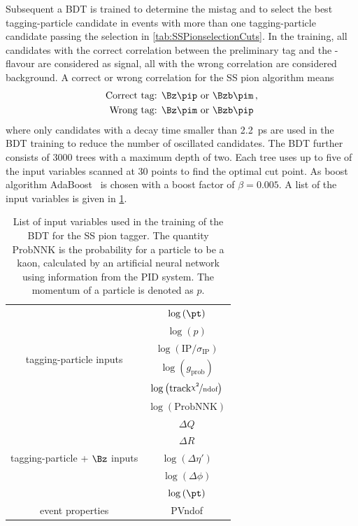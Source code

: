 Subsequent a BDT is trained to determine the mistag and to select the best tagging-particle candidate in events with more than one tagging-particle candidate passing  the selection in \cref{tab:SSPionselectionCuts}.
In the training, all candidates with the correct correlation between the preliminary tag and the \B-flavour are considered as signal, all with the wrong correlation are considered background.
A correct or wrong correlation for the SS pion algorithm means
\begin{align*}
	\text{Correct tag: }& \Bz\pip \text{ or } \Bzb\pim\,,\\
	\text{Wrong tag: }& \Bz\pim \text{ or } \Bzb\pip
\end{align*}
where only \B candidates with a decay time smaller than \SI{2.2}{\pico\second} are used in the BDT training to reduce the number of oscillated \B candidates.
The BDT further consists of \num{3000} trees with a maximum depth of two.
Each tree uses up to five of the input variables scanned at 30 points to find the optimal cut point.
As boost algorithm AdaBoost~\cite{AdaBoost} is chosen with a boost factor of $\beta=0.005$.
A list of the input variables is given in \cref{tab:BDTInputSSPion}.
\begin{table}[tbp]
	\centering
	\caption{List of input variables used in the training of the BDT for the SS pion tagger.
	The quantity $\mathrm{ProbNNK}$ is the probability for a particle to be a kaon, calculated by an artificial neural network using information from the \lhcb PID system.
	The momentum of a particle is denoted as $p$.}
	\begin{tabular}{cc}
		\toprule
		\multirow{6}{*}{tagging-particle inputs} 	& $\log\left(\pt\right)$ \\
													& $\log\left(p\right)$ \\
													& $\log\left(\text{IP}/\sigma_\text{IP}\right)$\\
													& $\log\left(g_\text{prob}\right)$\\
													& $\log\left(\text{track} \nicefrac{\chi^2}{\text{ndof}}\right)$ \\
													& $\log\left(\text{ProbNNK}\right)$\\
		\midrule
		\multirow{5}{*}{tagging-particle + $\Bz$ inputs}	& $\Delta Q$\\
															& $\Delta R$\\
															& $\log\left(\Delta\eta'\right)$\\
															& $\log\left(\Delta\phi\right)$\\
															& $\log\left(\pt\right)$\\
		\midrule
		\multirow{1}{*}{event properties}	& PVndof\\
		\bottomrule
	\end{tabular}
	\label{tab:BDTInputSSPion}
\end{table}
